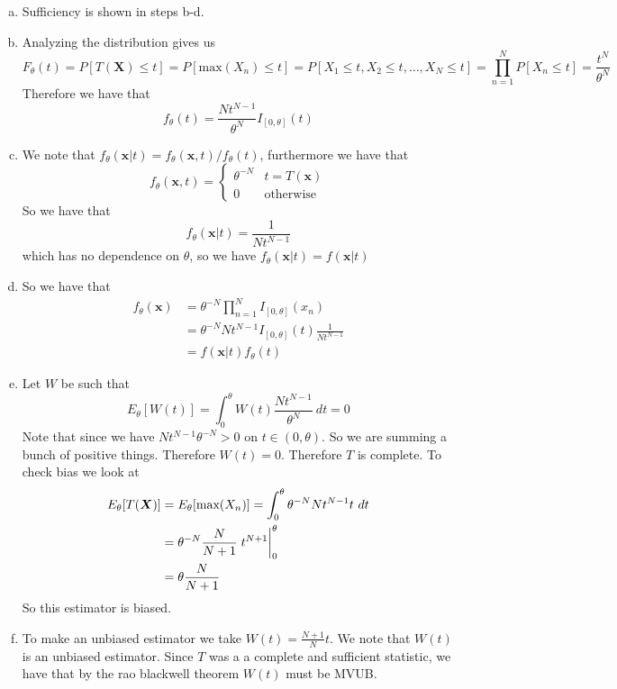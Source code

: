 \documentclass[a4paper]{article}
\begin{document}
\begin{enumerate}[a.]
  \item Sufficiency is shown in steps b-d.
  \item Analyzing the distribution gives us
    \[F_{\theta}(t) = P[T(\bm{X}) \leq t] = P[\text{max}(X_n) \leq t] = P[X_1 \leq t, X_2 \leq t, \dots, X_N \leq t] = \prod_{n = 1}^N P[X_n \leq t] = \frac{t^N}{\theta^N}\]
  Therefore we have that
  \[
    f_{\theta}(t) = \frac{Nt^{N-1}}{\theta^N} I_{[0,\theta]}(t)
  \]
\item We note that $f_{\theta}(\bm{x}|t) = f_{\theta}(\bm{x}, t)/f_{\theta}(t)$, furthermore we have that
  \[
    f_{\theta}(\bm{x},t) = 
    \begin{cases}
      \theta^{-N} & t = T(\bm{x})\\
      0 & \text{otherwise}
    \end{cases}
  \]
  So we have that
  \[
    f_{\theta}(\bm{x}|t) = \frac{1}{N t^{N-1}}
  \]
  which has no dependence on $\theta$, so we have $f_{\theta}(\bm{x}|t) = f(\bm{x}|t)$
  \item So we have that
    \[
      \begin{aligned}
        f_{\theta}(\bm{x}) &= \theta^{-N} \prod_{n=1}^N I_{[0,\theta]}(x_n) \\
                           &= \theta^{-N}Nt^{N-1}I_{[0, \theta]}(t) \frac{1}{Nt^{N-1}} \\
                           &= f(\bm{x}|t) f_{\theta}(t)
      \end{aligned}
    \]
  \item Let $W$ be such that 
    \[
      E_{\theta}\left[ W(t) \right] = \int_{0}^{\theta} W(t)\frac{Nt^{N-1}}{\theta^N}\ dt = 0
    \]
    Note that since we have $Nt^{N-1}\theta^{-N} > 0$ on $t \in (0, \theta)$. So we are summing a bunch of positive things. Therefore $W(t) = 0$. Therefore $T$ is complete. To check bias we look at 
    \[
      \begin{aligned}
        E_{\theta}[T(\bm{X})] &= E_{\theta}[\text{max}(X_n)] = \int_{0}^{\theta} \theta^{-N} Nt^{N-1}t\ dt \\
                              &= \theta^{-N} \frac{N}{N+1} \eval{t^{N+1}}_0^\theta  \\
                              &= \theta \frac{N}{N+1}
      \end{aligned}
    \]
    So this estimator is biased.
  \item To make an unbiased estimator we take $W(t) = \frac{N+1}{N}t$. We note that $W(t)$ is an unbiased estimator. Since $T$ was a a complete and sufficient statistic, we have that by the rao blackwell theorem $W(t)$ must be MVUB.
\end{enumerate}
\end{document}
